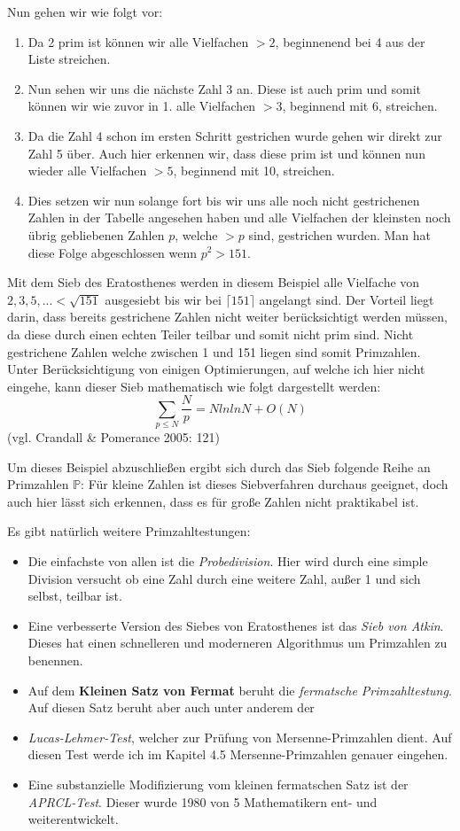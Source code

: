 \documentclass[german,12pt,a4paper]{article}
\begin{document}
Nun gehen wir wie folgt vor:
\begin{enumerate}
    \item Da 2 prim ist können wir alle Vielfachen $>2$, beginnenend bei 4 aus der Liste streichen.
    \item Nun sehen wir uns die nächste Zahl 3 an. Diese ist auch prim und somit können wir wie zuvor in 1. alle Vielfachen $>3$, beginnend mit 6, streichen.
    \item Da die Zahl 4 schon im ersten Schritt gestrichen wurde gehen wir direkt zur Zahl 5 über. Auch hier erkennen wir, dass diese prim ist und können nun wieder alle Vielfachen $>5$, beginnend mit 10, streichen.
    \item Dies setzen wir nun solange fort bis wir uns alle noch nicht gestrichenen Zahlen in der Tabelle angesehen haben und alle Vielfachen der kleinsten noch übrig gebliebenen Zahlen $p$, welche $>p$ sind, gestrichen wurden. Man hat diese Folge abgeschlossen wenn $p^2 > 151$. 
\end{enumerate}
Mit dem Sieb des Eratosthenes werden in diesem Beispiel alle Vielfache von $2, 3, 5, ... < \sqrt{151}$ ausgesiebt bis wir bei $\lceil151\rceil$ angelangt sind. Der Vorteil liegt darin, dass bereits gestrichene Zahlen nicht weiter berücksichtigt werden müssen, da diese durch einen echten Teiler teilbar und somit nicht prim sind. Nicht gestrichene Zahlen welche zwischen 1 und 151 liegen sind somit Primzahlen. Unter Berücksichtigung von einigen Optimierungen, auf welche ich hier nicht eingehe, kann dieser Sieb mathematisch wie folgt dargestellt werden:
\[\sum_{p\le N} \frac{N}p = N ln ln N + O(N)\]
(vgl. Crandall \& Pomerance 2005: 121)

Um dieses Beispiel abzuschließen ergibt sich durch das Sieb folgende Reihe an Primzahlen $\mathbb{P}$: %
Für kleine Zahlen ist dieses Siebverfahren durchaus geeignet, doch auch hier lässt sich erkennen, dass es für große Zahlen nicht praktikabel ist.

Es gibt natürlich weitere Primzahltestungen:
\begin{itemize}
    \item Die einfachste von allen ist die \textit{Probedivision}. Hier wird durch eine simple Division versucht ob eine Zahl durch eine weitere Zahl, außer 1 und sich selbst, teilbar ist.
    \item Eine verbesserte Version des Siebes von Eratosthenes ist das \textit{Sieb von Atkin}. Dieses hat einen schnelleren und moderneren Algorithmus um Primzahlen zu benennen.
    \item Auf dem \textbf{Kleinen Satz von Fermat} beruht die \textit{fermatsche Primzahltestung}. Auf diesen Satz beruht aber auch unter anderem der
    \item \textit{Lucas-Lehmer-Test}, welcher zur Prüfung von Mersenne-Primzahlen dient. Auf diesen Test werde ich im Kapitel 4.5 Mersenne-Primzahlen genauer eingehen.
    \item Eine substanzielle Modifizierung vom kleinen fermatschen Satz ist der \textit{APRCL-Test}. Dieser wurde 1980 von 5 Mathematikern ent- und weiterentwickelt.
\end{itemize}
\end{document}
